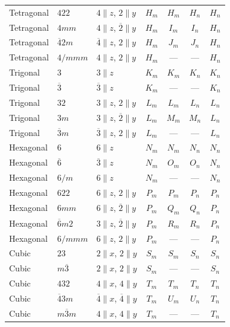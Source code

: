 \documentclass[a4paper,11pt]{article}
\newcommand{\ob}[1]{\overline{#1}}
\begin{document}
{\begin{tabular}{@{}l l l c c c c@{}}
Tetragonal & $422$         & $4 \!\parallel\! z$, $2 \!\parallel\! y$ & $H_m$ & $H_m$ & $H_n$ & $H_n$ \\
Tetragonal & $4mm$         & $4 \!\parallel\! z$, $\ob{2} \!\parallel\! y$ & $H_m$ & $I_m$ & $I_n$ & $H_n$ \\
Tetragonal & $\ob{4}2m$    & $\ob{4} \!\parallel\! z$, $2 \!\parallel\! y$ & $H_m$ & $J_m$ & $J_n$ & $H_n$ \\
Tetragonal & $4/mmm$       & $4 \!\parallel\! z$, $2 \!\parallel\! y$ & $H_m$ & ---   & ---   & $H_n$ \\
\addlinespace
Trigonal & $3$             & $3 \!\parallel\! z$                     & $K_m$ & $K_m$ & $K_n$ & $K_n$ \\
Trigonal & $\ob{3}$        & $\ob{3} \!\parallel\! z$                & $K_m$ & ---   & ---   & $K_n$ \\
Trigonal & $32$            & $3 \!\parallel\! z$, $2 \!\parallel\! y$ & $L_m$ & $L_m$ & $L_n$ & $L_n$ \\
Trigonal & $3m$            & $3 \!\parallel\! z$, $\ob{2} \!\parallel\! y$ & $L_m$ & $M_m$ & $M_n$ & $L_n$ \\
Trigonal & $\ob{3}m$       & $\ob{3} \!\parallel\! z$, $2 \!\parallel\! y$ & $L_m$ & ---   & ---   & $L_n$ \\
\addlinespace
Hexagonal & $6$            & $6 \!\parallel\! z$                     & $N_m$ & $N_m$ & $N_n$ & $N_n$ \\
Hexagonal & $\ob{6}$       & $\ob{3} \!\parallel\! z$                & $N_m$ & $O_m$ & $O_n$ & $N_n$ \\
Hexagonal & $6/m$          & $6 \!\parallel\! z$                     & $N_m$ & ---   & ---   & $N_n$ \\
Hexagonal & $622$          & $6 \!\parallel\! z$, $2 \!\parallel\! y$ & $P_m$ & $P_m$ & $P_n$ & $P_n$ \\
Hexagonal & $6mm$          & $6 \!\parallel\! z$, $\ob{2} \!\parallel\! y$ & $P_m$ & $Q_m$ & $Q_n$ & $P_n$ \\
Hexagonal & $\ob{6}m2$     & $3 \!\parallel\! z$, $\ob{2} \!\parallel\! y$ & $P_m$ & $R_m$ & $R_n$ & $P_n$ \\
Hexagonal & $6/mmm$        & $6 \!\parallel\! z$, $2 \!\parallel\! y$ & $P_m$ & ---   & ---   & $P_n$ \\
\addlinespace
Cubic & $23$               & $2 \!\parallel\! x$, $2 \!\parallel\! y$ & $S_m$ & $S_m$ & $S_n$ & $S_n$ \\
Cubic & $m\ob{3}$          & $2 \!\parallel\! x$, $2 \!\parallel\! y$ & $S_m$ & ---   & ---   & $S_n$ \\
Cubic & $432$              & $4 \!\parallel\! x$, $4 \!\parallel\! y$ & $T_m$ & $T_m$ & $T_n$ & $T_n$ \\
Cubic & $\ob{4}3m$         & $\ob{4} \!\parallel\! x$, $\ob{4} \!\parallel\! y$ & $T_m$ & $U_m$ & $U_n$ & $T_n$ \\
Cubic & $m\ob{3}m$         & $4 \!\parallel\! x$, $4 \!\parallel\! y$ & $T_m$ & ---   & ---   & $T_n$ \\
\bottomrule
\end{tabular}
}
\end{document}
